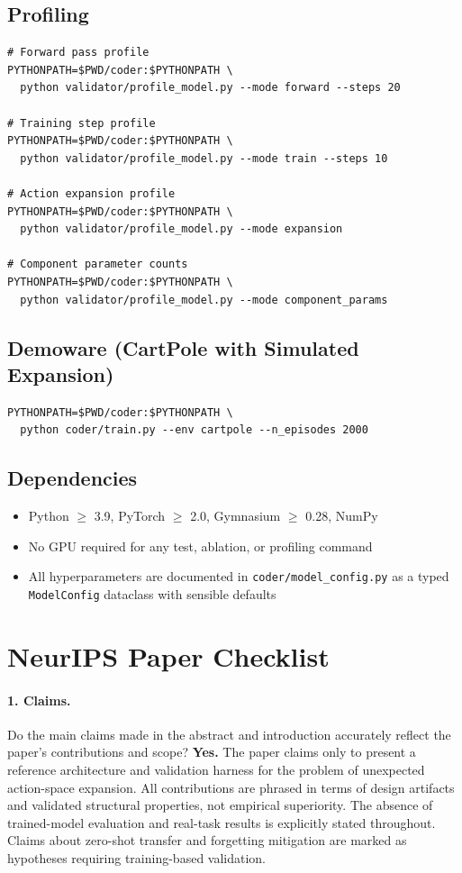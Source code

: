 \documentclass{article}
\begin{document}
\subsection{Profiling}
\begin{verbatim}
# Forward pass profile
PYTHONPATH=$PWD/coder:$PYTHONPATH \
  python validator/profile_model.py --mode forward --steps 20

# Training step profile
PYTHONPATH=$PWD/coder:$PYTHONPATH \
  python validator/profile_model.py --mode train --steps 10

# Action expansion profile
PYTHONPATH=$PWD/coder:$PYTHONPATH \
  python validator/profile_model.py --mode expansion

# Component parameter counts
PYTHONPATH=$PWD/coder:$PYTHONPATH \
  python validator/profile_model.py --mode component_params
\end{verbatim}

\subsection{Demoware (CartPole with Simulated Expansion)}
\begin{verbatim}
PYTHONPATH=$PWD/coder:$PYTHONPATH \
  python coder/train.py --env cartpole --n_episodes 2000
\end{verbatim}

\subsection{Dependencies}
\begin{itemize}
  \item Python $\geq$ 3.9, PyTorch $\geq$ 2.0, Gymnasium $\geq$ 0.28, NumPy
  \item No GPU required for any test, ablation, or profiling command
  \item All hyperparameters are documented in \texttt{coder/model\_config.py}
  as a typed \texttt{ModelConfig} dataclass with sensible defaults
\end{itemize}


\newpage
\section*{NeurIPS Paper Checklist}

\paragraph{1. Claims.}
Do the main claims made in the abstract and introduction accurately reflect the
paper's contributions and scope?
\textbf{Yes.} The paper claims only to present a reference architecture and
validation harness for the problem of unexpected action-space expansion. All
contributions are phrased in terms of design artifacts and validated structural
properties, not empirical superiority. The absence of trained-model evaluation
and real-task results is explicitly stated throughout. Claims about zero-shot
transfer and forgetting mitigation are marked as hypotheses requiring
training-based validation.
\end{document}
